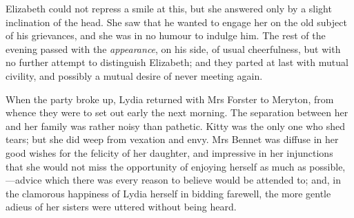 Elizabeth could not repress a smile at this, but she answered only by a slight inclination of the head. She saw that he wanted to engage her on the old subject of his grievances, and she was in no humour to indulge him. The rest of the evening passed with the \textit{appearance}, on his side, of usual cheerfulness, but with no further attempt to distinguish Elizabeth; and they parted at last with mutual civility, and possibly a mutual desire of never meeting again.

When the party broke up, Lydia returned with Mrs Forster to Meryton, from whence they were to set out early the next morning. The separation between her and her family was rather noisy than pathetic. Kitty was the only one who shed tears; but she did weep from vexation and envy. Mrs Bennet was diffuse in her good wishes for the felicity of her daughter, and impressive in her injunctions that she would not miss the opportunity of enjoying herself as much as possible,—advice which there was every reason to believe would be attended to; and, in the clamorous happiness of Lydia herself in bidding farewell, the more gentle adieus of her sisters were uttered without being heard.
